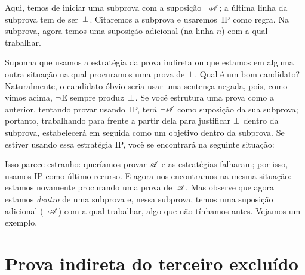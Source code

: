 \begin{fitchproof}
\open
{}\AS
\ellipsesline 
{}
\close
{}
\end{fitchproof}
Aqui, temos de iniciar uma subprova com a suposição $\neg \mathscr{A}$;
a última linha da subprova tem de ser~$\bot$. Citaremos a subprova e usaremos~IP como regra. Na subprova, agora temos uma suposição adicional (na linha $n$) com a qual trabalhar.

Suponha que usamos a estratégia da prova indireta ou que estamos em alguma outra situação na qual procuramos uma prova de $\bot$. Qual é um bom candidato? Naturalmente, o candidato óbvio seria usar uma sentença negada, pois, como vimos acima, $\neg$E sempre produz~$\bot$. Se você estrutura uma prova como a anterior, tentando provar  usando~IP, terá $\neg \mathscr{A}$ como suposição da sua subprova; portanto, trabalhando para frente a partir dela para justificar $\bot$ dentro da subprova, estabelecerá em seguida  como um objetivo dentro da subprova. Se estiver usando essa estratégia IP, você se encontrará na seguinte situação:
\begin{fitchproof}
\open
{}\AS
\ellipsesline
{}
\close
{}
\end{fitchproof} 
Isso parece estranho: queríamos provar $\mathscr{A}$ e as estratégias falharam; por isso, usamos IP como último recurso. E agora nos encontramos na mesma situação: estamos novamente procurando uma prova de~$\mathscr{A}$. Mas observe que agora estamos \emph{dentro} de uma subprova e, nessa subprova, temos uma suposição adicional ($\neg \mathscr{A}$) com a qual trabalhar, algo que não tínhamos antes. Vejamos um exemplo.

\section{Prova indireta do terceiro excluído}\label{s:proofLEM}

